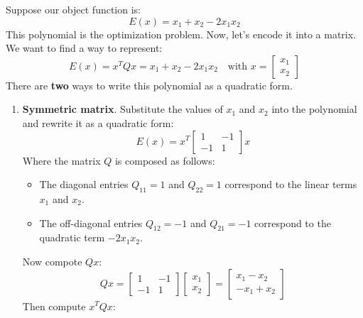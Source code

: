 \begin{examplebox}
    Suppose our object function is:
    \begin{equation*}
        E(x) = x_1 + x_2 - 2x_1 x_2
    \end{equation*}
    This polynomial is the optimization problem. Now, let's encode it into a matrix. We want to find a way to represent:
    \begin{equation*}
        E(x) = x^T Q x = x_1 + x_2 - 2x_1 x_2 \quad \text{with } x = \begin{bmatrix} x_1 \\ x_2 \end{bmatrix}
    \end{equation*}
    There are \textbf{two} ways to write this polynomial as a quadratic form.
    \begin{enumerate}
        \item \textbf{Symmetric matrix}. Substitute the values of $x_1$ and $x_2$ into the polynomial and rewrite it as a quadratic form:
        \begin{equation*}
            E(x) = x^T \begin{bmatrix} 1 & -1 \\ -1 & 1 \end{bmatrix} x
        \end{equation*}
        Where the matrix $Q$ is composed as follows:
        \begin{itemize}
            \item The diagonal entries $Q_{11} = 1$ and $Q_{22} = 1$ correspond to the linear terms $x_1$ and $x_2$.
            \item The off-diagonal entries $Q_{12} = -1$ and $Q_{21} = -1$ correspond to the quadratic term $-2x_1 x_2$.
        \end{itemize}
        Now compote $Qx$:
        \begin{equation*}
            Qx = \begin{bmatrix} 1 & -1 \\ -1 & 1 \end{bmatrix} \begin{bmatrix} x_1 \\ x_2 \end{bmatrix} = \begin{bmatrix} x_1 - x_2 \\ -x_1 + x_2 \end{bmatrix}
        \end{equation*}
        Then compute $x^T Q x$:

\end{enumerate}
\end{examplebox}
